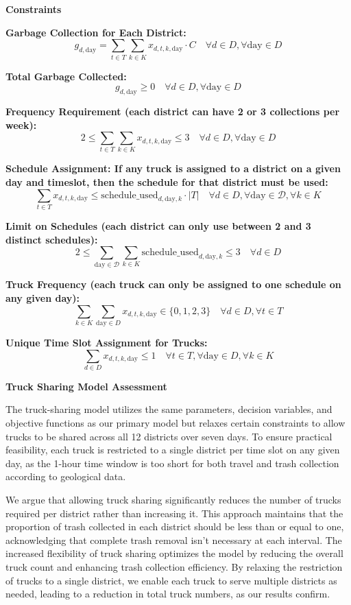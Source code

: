 \documentclass{article}
\begin{document}
\textbf{Constraints}

\textbf{Garbage Collection for Each District:}
\[
g_{d,\text{day}} = \sum_{t \in T} \sum_{k \in K} x_{d,t,k,\text{day}} \cdot C \quad \forall d \in D, \forall \text{day} \in D
\]

\textbf{Total Garbage Collected:}
\[
g_{d,\text{day}} \geq 0 \quad \forall d \in D, \forall \text{day} \in D
\]

\textbf{Frequency Requirement (each district can have 2 or 3 collections per week):}
\[
2 \leq \sum_{t \in T} \sum_{k \in K} x_{d,t,k,\text{day}} \leq 3 \quad \forall d \in D, \forall \text{day} \in D
\]

\textbf{Schedule Assignment: If any truck is assigned to a district on a given day and timeslot, then the schedule for that district must be used:}
\[
\sum_{t \in T} x_{d,t,k,\text{day}} \leq \text{schedule\_used}_{d,\text{day},k} \cdot |T| \quad \forall d \in D, \forall \text{day} \in \mathcal{D}, \forall k \in K
\]

\textbf{Limit on Schedules (each district can only use between 2 and 3 distinct schedules):}
\[
2 \leq \sum_{\text{day} \in \mathcal{D}} \sum_{k \in K} \text{schedule\_used}_{d,\text{day},k} \leq 3 \quad \forall d \in D
\]

\textbf{Truck Frequency (each truck can only be assigned to one schedule on any given day):}
\[
\sum_{k \in K} \sum_{\text{day} \in D} x_{d,t,k,\text{day}} \in \{0, 1, 2, 3\} \quad \forall d \in D, \forall t \in T
\]

\textbf{Unique Time Slot Assignment for Trucks:}
\[
\sum_{d \in D} x_{d,t,k,\text{day}} \leq 1 \quad \forall t \in T, \forall \text{day} \in D, \forall k \in K
\]

\textbf{Truck Sharing Model Assessment}


The truck-sharing model utilizes the same parameters, decision variables, and objective functions as our primary model but relaxes certain constraints to allow trucks to be shared across all 12 districts over seven days. To ensure practical feasibility, each truck is restricted to a single district per time slot on any given day, as the 1-hour time window is too short for both travel and trash collection according to geological data.

We argue that allowing truck sharing significantly reduces the number of trucks required per district rather than increasing it. This approach maintains that the proportion of trash collected in each district should be less than or equal to one, acknowledging that complete trash removal isn’t necessary at each interval. The increased flexibility of truck sharing optimizes the model by reducing the overall truck count and enhancing trash collection efficiency. By relaxing the restriction of trucks to a single district, we enable each truck to serve multiple districts as needed, leading to a reduction in total truck numbers, as our results confirm.
\end{document}

